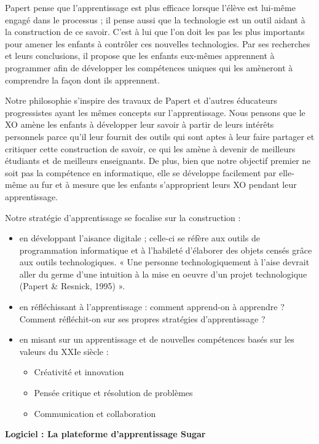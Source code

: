 \documentclass[11pt]{article}
\begin{document}
Papert pense que l'apprentissage est plus efficace lorsque l'élève est
lui-même engagé dans le processus ; il pense aussi que la technologie est
un outil aidant à la construction de ce savoir. C'est à lui que l'on doit
les pas les plus importants pour amener les enfants à contrôler ces
nouvelles technologies. Par ses recherches et leurs conclusions, il propose
que les enfants eux-mêmes apprennent à programmer afin de développer les
compétences uniques qui les amèneront à comprendre la façon dont ils
apprennent.

Notre philosophie s'inspire des travaux de Papert et d'autres éducateurs
progressistes ayant les mêmes concepts sur l'apprentissage. Nous pensons
que le XO amène les enfants à développer leur savoir à partir de leurs
intérêts personnels parce qu'il leur fournit des outils qui sont aptes à
leur faire partager et critiquer cette construction de savoir, ce qui les
amène à devenir de meilleurs étudiants et de meilleurs enseignants. De
plus, bien que notre objectif premier ne soit pas la compétence en
informatique, elle se développe facilement par elle-même au fur et à mesure
que les enfants s'approprient leurs XO pendant leur apprentissage.

Notre stratégie d'apprentissage se focalise sur la construction :

\begin{itemize}
\item en développant l'aisance digitale ; celle-ci se réfère aux outils de
  programmation informatique et à l'habileté d'élaborer des objets censés
  grâce aux outils technologiques. « Une personne technologiquement à
  l'aise devrait aller du germe d'une intuition à la mise en oeuvre d'un
  projet technologique (Papert \& Resnick, 1995) ».
\item en réfléchissant à l'apprentissage : comment apprend-on à apprendre ?
  Comment réfléchit-on sur ses propres stratégies d'apprentissage ?
\item en misant sur un apprentissage et de nouvelles compétences basés sur les
  valeurs du XXIe siècle :
\begin{itemize}
\item Créativité et innovation
\item Pensée critique et résolution de problèmes
\item Communication et collaboration
\end{itemize}
\end{itemize}

\textbf{Logiciel : La plateforme d'apprentissage Sugar}
\end{document}
